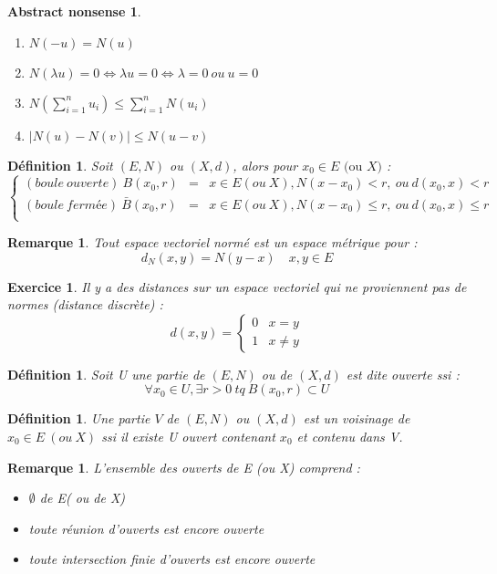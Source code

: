 \documentclass[a4paper, oneside]{report}
\theoremstyle{break}
\newtheorem{defi}[thm]{Définition}
\newtheorem{remar}[thm]{Remarque}
\newtheorem{exo}[thm]{Exercice}
\newtheorem*{absnon}{Abstract nonsense}
\newcommand{\ev}{espace vectoriel }
\newcommand{\evn}{espace vectoriel normé }
\begin{document}
\begin{absnon}
\begin{enumerate}
\item $N(-u)=N(u)$
\item $N(\lambda u)=0 \Leftrightarrow \lambda u =0 \Leftrightarrow \lambda =0~ou~u=0$
\item $N(\sum_{i=1}^{n}u_i) \leq \sum_{i=1}^{n}N(u_i)$
\item $|N(u)-N(v)|\leq N(u-v)$
\end{enumerate}
\end{absnon}


\begin{defi}
Soit $(E,N)$ ou $(X,d)$, alors pour $x_0\in E \text{ (ou }X)$ :
$$\left\{\begin{array}{lll}
(boule~ouverte)~B(x_0,r)&=& x\in E(ou~X), N(x-x_0)<r,~ou~d(x_0,x)<r\\
(boule~fermée)~\bar{B}(x_0,r)&=&x\in E(ou~X), N(x-x_0)\leq r,~ou~d(x_0,x)\leq r\\
\end{array}\right.$$
\end{defi}

\begin{remar}
Tout \evn est un espace métrique pour :
$$d_N(x,y)=N(y-x)\hspace{1em}x,y\in E$$
\end{remar}

\begin{exo}
Il y a des distances sur un \ev qui ne proviennent pas de normes (distance discrète) :
$$d(x,y)=\left\{\begin{array}{ll}
0 & x=y\\
1 & x\neq y
\end{array}\right.$$
\end{exo}

\begin{defi}
Soit U une partie de $(E,N)$ ou de $(X, d)$ est dite ouverte ssi :
$$\forall x_0\in U, \exists r>0~tq~B(x_0,r)\subset U$$
\end{defi}

\begin{defi}        
Une partie $V$ de $(E,N)$ ou $(X, d)$ est un voisinage de $x_0\in E~(ou~X)$ ssi il existe U ouvert contenant $x_0$ et contenu dans V.
\end{defi}

\begin{remar}
L'ensemble des ouverts de E (ou X) comprend :
\begin{itemize}
\item $\emptyset$ de E( ou de X)
\item toute réunion d'ouverts est encore ouverte
\item toute intersection finie d'ouverts est encore ouverte
\end{itemize}
\end{remar}
\end{document}
